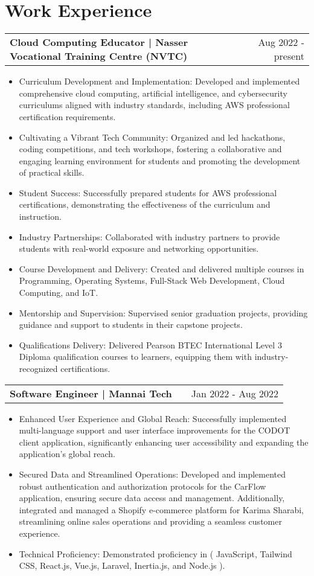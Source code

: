 \documentclass[a4paper,11pt]{article}
\makeatletter
\newenvironment{joblong}[2]
    {
    \begin{tabularx}{\linewidth}{@{}l X r@{}}
    \textbf{#1} & \hfill &  #2 \\[3.75pt]
    \end{tabularx}
    \begin{minipage}[t]{\linewidth}
    \begin{itemize}[nosep,after=\strut, leftmargin=1em, itemsep=3pt,label=--]
    }
    {
    \end{itemize}
    \end{minipage}    
    }
\makeatother
\begin{document}
\section{Work Experience}

\begin{joblong}{Cloud Computing Educator | Nasser Vocational Training Centre (NVTC)}{Aug 2022 - present}
\item Curriculum Development and Implementation: Developed and implemented comprehensive cloud computing, artificial intelligence, and cybersecurity curriculums aligned with industry standards, including AWS professional certification requirements.
\item Cultivating a Vibrant Tech Community: Organized and led hackathons, coding competitions, and tech workshops, fostering a collaborative and engaging learning environment for students and promoting the development of practical skills.
\item Student Success: Successfully prepared students for AWS professional certifications, demonstrating the effectiveness of the curriculum and instruction.
\item Industry Partnerships: Collaborated with industry partners to provide students with real-world exposure and networking opportunities.
\item Course Development and Delivery: Created and delivered multiple courses in Programming, Operating Systems, Full-Stack Web Development, Cloud Computing, and IoT.
\item Mentorship and Supervision: Supervised senior graduation projects, providing guidance and support to students in their capstone projects.
\item Qualifications Delivery: Delivered Pearson BTEC International Level 3 Diploma qualification courses to learners, equipping them with industry-recognized certifications.
\end{joblong}

\begin{joblong}{Software Engineer | Mannai Tech}{Jan 2022 - Aug 2022}
    \item Enhanced User Experience and Global Reach: Successfully implemented multi-language support and user interface improvements for the CODOT client application, significantly enhancing user accessibility and expanding the application's global reach.
    \item Secured Data and Streamlined Operations: Developed and implemented robust authentication and authorization protocols for the CarFlow application, ensuring secure data access and management. Additionally, integrated and managed a Shopify e-commerce platform for Karima Sharabi, streamlining online sales operations and providing a seamless customer experience.
    \item Technical Proficiency: Demonstrated proficiency in ( JavaScript, Tailwind CSS, React.js, Vue.js, Laravel, Inertia.js, and Node.js ).
    
\end{joblong}
\end{document}

